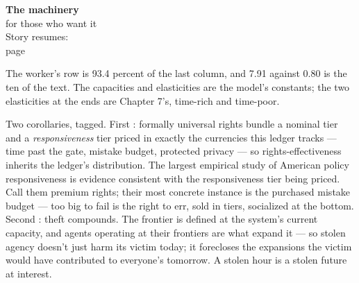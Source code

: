 \begin{machinery}{\textbf{The machinery}\\for those who want it\\[3pt]{\color{muted}Story resumes:\\page~\pageref{ch14}}}
\begin{booktable}
\tablehair\nobreak
{}\tablerule
\end{booktable}

\noindent The worker's row is 93.4 percent of the last column, and 7.91 against 0.80 is the ten of the text. The capacities and elasticities are the model's constants; the two elasticities at the ends are Chapter 7's, time-rich and time-poor.

Two corollaries, tagged. First : formally
universal rights bundle a nominal tier and a \emph{responsiveness} tier
priced in exactly the currencies this ledger tracks --- time past the
gate, mistake budget, protected privacy --- so rights-effectiveness
inherits the ledger's distribution. The largest empirical study of
American policy responsiveness is evidence consistent with the
responsiveness tier being priced. Call them premium rights; their most
concrete instance is the purchased mistake budget --- too big to fail is
the right to err, sold in tiers, socialized at the bottom. Second
: theft compounds. The frontier is defined at the
system's current capacity, and agents operating at their frontiers are
what expand it --- so stolen agency doesn't just harm its victim today;
it forecloses the expansions the victim would have contributed to
everyone's tomorrow. A stolen hour is a stolen future at interest.


\end{machinery}
